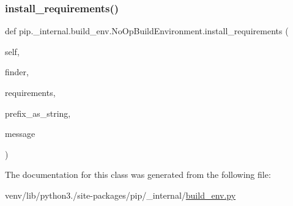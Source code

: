 \subsubsection{\texorpdfstring{install\+\_\+requirements()}{install\_requirements()}}
{\footnotesize\ttfamily def pip.\+\_\+internal.\+build\+\_\+env.\+No\+Op\+Build\+Environment.\+install\+\_\+requirements (\begin{DoxyParamCaption}\item[{}]{self,  }\item[{}]{finder,  }\item[{}]{requirements,  }\item[{}]{prefix\+\_\+as\+\_\+string,  }\item[{}]{message }\end{DoxyParamCaption})}



The documentation for this class was generated from the following file\+:\begin{DoxyCompactItemize}
\item 
venv/lib/python3./site-\/packages/pip/\+\_\+internal/\hyperlink{build__env_8py}{build\+\_\+env.\+py}\end{DoxyCompactItemize}

